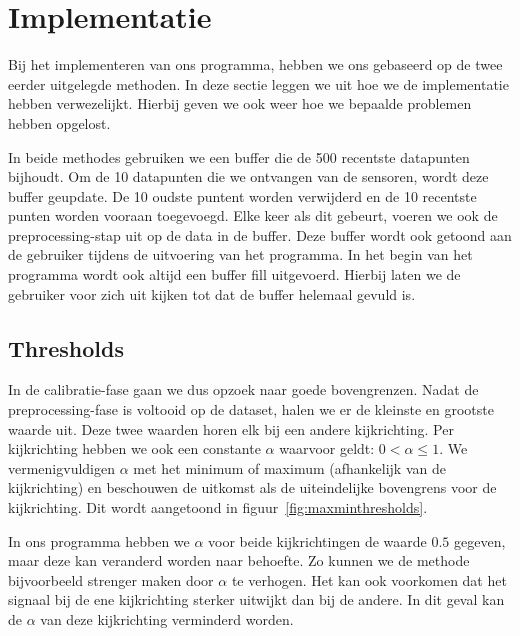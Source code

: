 \documentclass{article}
\begin{document}
\section{Implementatie}

Bij het implementeren van ons programma, hebben we ons gebaseerd op de twee eerder uitgelegde methoden. In deze sectie leggen we uit hoe we de implementatie hebben verwezelijkt. Hierbij geven we ook weer hoe we bepaalde problemen hebben opgelost.

In beide methodes gebruiken we een buffer die de 500 recentste datapunten bijhoudt. Om de 10 datapunten die we ontvangen van de sensoren, wordt deze buffer geupdate. De 10 oudste puntent worden verwijderd en de 10 recentste punten worden vooraan toegevoegd. Elke keer als dit gebeurt, voeren we ook de preprocessing-stap uit op de data in de buffer. Deze buffer wordt ook getoond aan de gebruiker tijdens de uitvoering van het programma. In het begin van het programma wordt ook altijd een buffer fill uitgevoerd. Hierbij laten we de gebruiker voor zich uit kijken tot dat de buffer helemaal gevuld is.

\subsection{Thresholds}

In de calibratie-fase gaan we dus opzoek naar goede bovengrenzen. Nadat de preprocessing-fase is voltooid op de dataset, halen we er de kleinste en grootste waarde uit. Deze twee waarden horen elk bij een andere kijkrichting. Per kijkrichting hebben we ook een constante $\alpha$ waarvoor geldt: $0 < \alpha \leq 1$. We vermenigvuldigen $\alpha$ met het minimum of maximum (afhankelijk van de kijkrichting) en beschouwen de uitkomst als de uiteindelijke bovengrens voor de kijkrichting. Dit wordt aangetoond in figuur~\ref{fig:maxminthresholds}.

In ons programma hebben we $\alpha$ voor beide kijkrichtingen de waarde $0.5$ gegeven, maar deze kan veranderd worden naar behoefte. Zo kunnen we de methode bijvoorbeeld strenger maken door $\alpha$ te verhogen. Het kan ook voorkomen dat het signaal bij de ene kijkrichting sterker uitwijkt dan bij de andere. In dit geval kan de $\alpha$ van deze kijkrichting verminderd worden.
\end{document}

